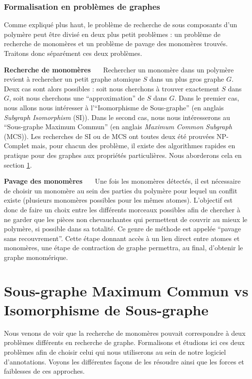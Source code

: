 \subsubsection{Formalisation en problèmes de graphes}

Comme expliqué plus haut, le problème de recherche de sous composants d'un polymère peut être divisé en deux
plus petit problèmes : un problème de recherche de monomères et un problème de pavage des monomères trouvés. Traitons
donc séparément ces deux problèmes.

\textbf{Recherche de monomères}~~~
Rechercher un monomère dans un polymère revient à rechercher un petit graphe atomique $S$ dans un plus gros graphe $G$.
Deux cas sont alors possibles : soit nous cherchons à trouver exactement $S$ dans $G$, soit nous cherchons une ``approximation'' de $S$ dans $G$.
Dans le premier cas, nous allons nous intéresser à l'``Isomorphisme de Sous-graphe'' (en anglais \textit{Subgraph Isomorphism} (SI)).
Dans le second cas, nous nous intéresserons au ``Sous-graphe Maximum Commun'' (en anglais \textit{Maximum Common Subgraph} (MCS)).
Les recherches de SI ou de MCS ont toutes deux été prouvées NP-Complet mais, pour chacun des problème, il existe des algorithmes rapides en pratique pour des graphes aux propriétés particulières.
Nous aborderons cela en section \ref{SI_MCS}.

\textbf{Pavage des monomères}~~~
Une fois les monomères détectés, il est nécessaire de choisir un monomère au sein des parties du polymère pour lequel un conflit existe (plusieurs monomères possibles pour les mêmes atomes).
L'objectif est donc de faire un choix entre les différents morceaux possibles afin de chercher à ne garder que les pièces non chevauchantes qui permettent de couvrir au mieux le polymère, si possible dans sa totalité.
Ce genre de méthode est appelée ``pavage sans recouvrement''.
Cette étape donnant accès à un lien direct entre atomes et monomères, une étape de contraction de graphe permettra, au final, d'obtenir le graphe monomérique.




\section{Sous-graphe Maximum Commun vs Isomorphisme de Sous-graphe}
\label{SI_MCS}

Nous venons de voir que la recherche de monomères pouvait correspondre à deux problèmes différents en recherche de graphe.
Formalisons et étudions ici ces deux problèmes afin de choisir celui qui nous utiliserons au sein de notre logiciel d'annotations.
Voyons les différentes façons de les résoudre ainsi que les forces et faiblesses de ces approches.


